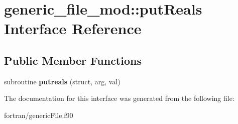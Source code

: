 \hypertarget{interfacegeneric__file__mod_1_1put_reals}{}\section{generic\+\_\+file\+\_\+mod\+:\+:put\+Reals Interface Reference}
\label{interfacegeneric__file__mod_1_1put_reals}
\subsection*{Public Member Functions}
\begin{DoxyCompactItemize}
\item 
\mbox{\label{interfacegeneric__file__mod_1_1put_reals_afb0cb202175857aff47e18e20a2a9386}} 
subroutine {\bfseries putreals} (struct, arg, val)
\end{DoxyCompactItemize}


The documentation for this interface was generated from the following file\+:\begin{DoxyCompactItemize}
\item 
fortran/generic\+File.\+f90\end{DoxyCompactItemize}
